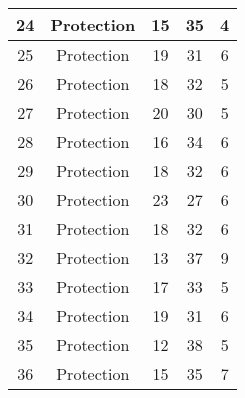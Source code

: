 \documentclass[results.tex]{subfiles}
\begin{document}
\begin{center}
\begin{tabular}{| c || c | c | c | c |}
            \hline
            24                      & Protection                   & 15                     & 35                      & 4                    \\
            \hline
            25                      & Protection                   & 19                     & 31                      & 6                    \\
            \hline
            26                      & Protection                   & 18                     & 32                      & 5                    \\
            \hline
            27                      & Protection                   & 20                     & 30                      & 5                    \\
            \hline
            28                      & Protection                   & 16                     & 34                      & 6                    \\
            \hline
            29                      & Protection                   & 18                     & 32                      & 6                    \\
            \hline
            30                      & Protection                   & 23                     & 27                      & 6                    \\
            \hline
            31                      & Protection                   & 18                     & 32                      & 6                    \\
            \hline
            32                      & Protection                   & 13                     & 37                      & 9                    \\
            \hline
            33                      & Protection                   & 17                     & 33                      & 5                    \\
            \hline
            34                      & Protection                   & 19                     & 31                      & 6                    \\
            \hline
            35                      & Protection                   & 12                     & 38                      & 5                    \\
            \hline
            36                      & Protection                   & 15                     & 35                      & 7                    \\

\end{tabular}
\end{center}
\end{document}
